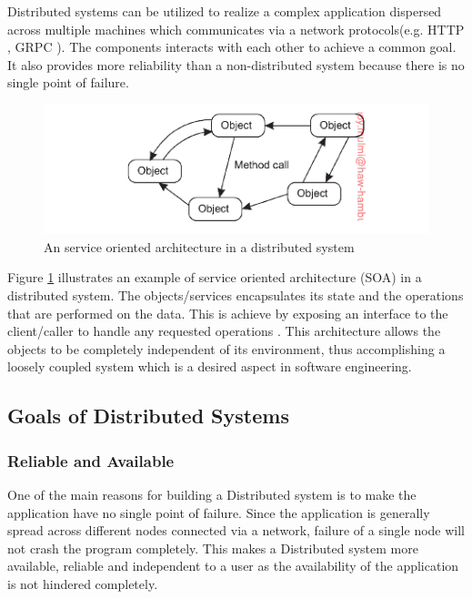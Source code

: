     \par
        Distributed systems can be utilized to realize a complex application dispersed across
        multiple machines which communicates via a network protocols(e.g. HTTP \cite{HTTP}, 
        GRPC \cite{grpc}). The 
        components interacts with each other to achieve a common goal. It also provides
        more reliability than a non-distributed system because there is no single point
        of failure. 

    \begin{figure}[H]
        \centering \includegraphics[scale=0.9]{grafiken/objectBasedDS.png}
        \caption{An service oriented architecture in a distributed system 
            \cite[p.~62]{DistributedSystems}}
        \label{fig:objectBasedDS}
    \end{figure}

    \par
        Figure \ref{fig:objectBasedDS} illustrates an example of service oriented architecture 
        (SOA) in a distributed system. The objects/services encapsulates its state and 
        the operations that are performed on the data. This is achieve by exposing an 
        interface to the client/caller to handle any requested operations
        \cite{DistributedSystems}. This architecture allows the objects to be
        completely independent of its environment, thus accomplishing a loosely
        coupled system which is a desired aspect in software engineering.
        
    \subsection{Goals of Distributed Systems} 
        \subsubsection{Reliable and Available}
        One of the main reasons for building a Distributed system is to make the application have no single point of failure.
        Since the application is generally spread across different nodes connected via a network, failure of a single node will not 
        crash the program completely. This makes a Distributed system more available, reliable and independent to a user as the availability
        of the application is not hindered completely.
        

